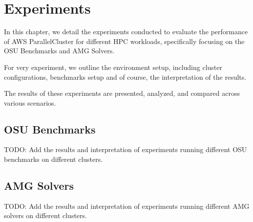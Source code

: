 

\chapter{Experiments}

In this chapter, we detail the experiments conducted to evaluate the performance of AWS ParallelCluster for different HPC workloads, specifically focusing on the OSU Benchmarks and AMG Solvers.

For very experiment, we outline the environment setup, including cluster configurations, benchmarks setup and of course, the interpretation of the results.

The results of these experiments are presented, analyzed, and compared across various scenarios.

\section{OSU Benchmarks}

TODO: Add the results and interpretation of experiments running different OSU benchmarks on different clusters.

\section{AMG Solvers}

TODO: Add the results and interpretation of experiments running different AMG solvers on different clusters.
